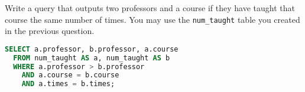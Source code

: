 \question Write a query that outputs two professors and a course if they have
taught that course the same number of times. You may use the \texttt{num\_taught}
table you created in the previous question.

\begin{solution}[1.0in]
\begin{lstlisting}[language=SQL]
SELECT a.professor, b.professor, a.course
  FROM num_taught AS a, num_taught AS b
  WHERE a.professor > b.professor
    AND a.course = b.course
    AND a.times = b.times;
\end{lstlisting}
\end{solution}
